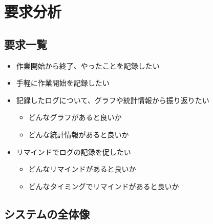 \section{要求分析} \label{sec:require}

\subsection{要求一覧}

\begin{itemize}
  \item 作業開始から終了、やったことを記録したい
  \item 手軽に作業開始を記録したい
  \item 記録したログについて、グラフや統計情報から振り返りたい
  \begin{itemize}
    \item どんなグラフがあると良いか
    \item どんな統計情報があると良いか
  \end{itemize}
  \item リマインドでログの記録を促したい
  \begin{itemize}
    \item どんなリマインドがあると良いか
    \item どんなタイミングでリマインドがあると良いか
  \end{itemize}
\end{itemize}

\subsection{システムの全体像}


